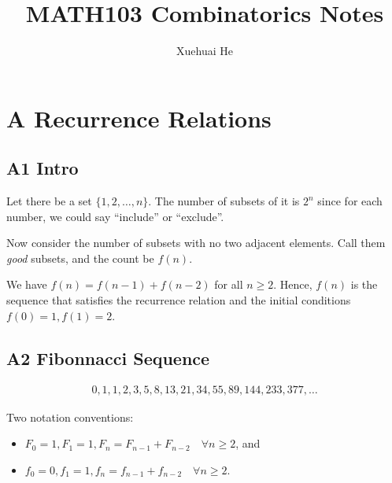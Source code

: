 \documentclass[12pt]{article}
\begin{document}
\title{MATH103 Combinatorics Notes}
\author{Xuehuai He}
\maketitle

\hypertarget{toc}{}
{\parskip=0.05in
\tableofcontents}

\spl

\newpage
\pagestyle{updated}
\section{A Recurrence Relations}
\subsection{A1 Intro}
\rmk Let there be a set $\{1,2,\dots,n\}$. The number of subsets of it is $2^n$ since for each number, we could say ``include'' or ``exclude''.

\eg Now consider the number of subsets with no two adjacent elements. Call them \textit{good} subsets, and the count be $f(n)$.


We have $f(n)=f(n-1)+f(n-2)$ for all $n\geq 2$. Hence, $f(n)$ is the sequence that satisfies the recurrence relation and the initial conditions $f(0)=1, f(1)=2$.

\subsection{A2 Fibonnacci Sequence}
\begin{align*}
    0,1,1,2,3,5,8,13,21,34,55,89,144,233,377,\dots
\end{align*}

\rmk Two notation conventions: \begin{itemize}
    \item $F_0=1, F_1=1, F_n=F_{n-1}+F_{n-2}\quad \forall n\geq 2$, and
    \item $f_0=0, f_1=1, f_n=f_{n-1}+f_{n-2}\quad \forall n\geq 2$.
\end{itemize}
\end{document}
